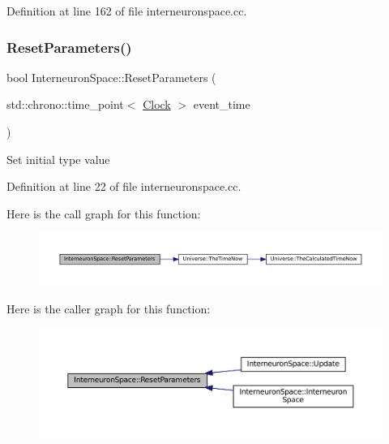 Definition at line 162 of file interneuronspace.\+cc.

\mbox{\label{class_interneuron_space_a3a9776e4a77b87374204468ca7974157}} 
\subsubsection{\texorpdfstring{Reset\+Parameters()}{ResetParameters()}}
{\footnotesize\ttfamily bool Interneuron\+Space\+::\+Reset\+Parameters (\begin{DoxyParamCaption}\item[{std\+::chrono\+::time\+\_\+point$<$ \mbox{\hyperlink{universe_8h_a0ef8d951d1ca5ab3cfaf7ab4c7a6fd80}{Clock}} $>$}]{event\+\_\+time }\end{DoxyParamCaption})}

Set initial type value 

Definition at line 22 of file interneuronspace.\+cc.

Here is the call graph for this function\+:\nopagebreak
\begin{figure}[H]
\begin{center}
\leavevmode
\includegraphics[width=350pt]{class_interneuron_space_a3a9776e4a77b87374204468ca7974157_cgraph}
\end{center}
\end{figure}
Here is the caller graph for this function\+:\nopagebreak
\begin{figure}[H]
\begin{center}
\leavevmode
\includegraphics[width=350pt]{class_interneuron_space_a3a9776e4a77b87374204468ca7974157_icgraph}
\end{center}
\end{figure}
\mbox{\label{class_interneuron_space_ab56b0336c9e53f7b448e9d35e617e8c0}} 
